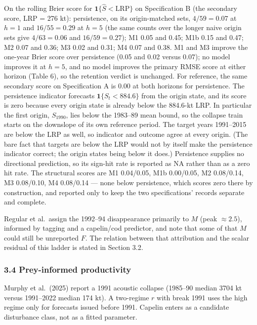 \documentclass[11pt]{article}
\begin{document}
On the rolling Brier score for \(\mathbf{1}\{\hat S<\mathrm{LRP}\}\) on
Specification B (the secondary score, LRP = 276 kt):
persistence, on its origin-matched sets, \(4/59 = 0.07\) at \(h{=}1\)
and \(16/55 = 0.29\) at \(h{=}5\) (the same counts over the longer naive
origin sets give \(4/63 = 0.06\) and \(16/59 = 0.27\)); M1 0.05 and 0.45;
M1b 0.15 and 0.47; M2 0.07 and 0.36; M3 0.02 and 0.31; M4 0.07 and 0.38.
M1 and M3 improve the one-year Brier score over persistence (0.05 and
0.02 versus 0.07); no model improves it at \(h{=}5\), and no model
improves the primary RMSE score at either horizon (Table 6), so the
retention verdict is unchanged. For reference, the same secondary score on Specification A is 0.00 at
both horizons for persistence. The persistence indicator forecasts
\(\mathbf{1}\{S_t<884.6\}\) from the origin state, and its score is zero
because every origin state is already below the 884.6-kt LRP. In
particular the first origin, \(S_{1990}\), lies below the 1983--89 mean
bound, so the collapse train starts on the downslope of its own
reference period. The target years 1991--2015 are below the LRP as well,
so indicator and outcome agree at every origin. (The bare fact that targets are below the LRP
would not by itself make the persistence indicator correct; the origin
states being below it does.) Persistence supplies no directional prediction, so its sign-hit rate
is reported as NA rather than as a zero hit rate. The structural
scores are M1 0.04/0.05, M1b
0.00/0.05, M2 0.08/0.14, M3 0.08/0.10, M4 0.08/0.14 --- none below
persistence, which scores zero there by construction, and reported only to keep the two specifications' records
separate and complete.

Regular et al.~assign the 1992--94 disappearance primarily to \(M\)
(peak \(\approx 2.5\)), informed by tagging and a capelin/cod predictor,
and note that some of that \(M\) could still be unreported \(F\). The
relation between that attribution and the scalar residual of this ladder
is stated in Section 3.2.

\subsubsection{3.4 Prey-informed
productivity}\label{prey-informed-productivity}

Murphy et al.~(2025) report a 1991 acoustic collapse (1985--90 median
3704 kt versus 1991--2022 median 174 kt). A two-regime \(r\) with break
1991 uses the high regime only for forecasts issued before 1991. Capelin
enters as a candidate disturbance class, not as a fitted parameter.
\end{document}
